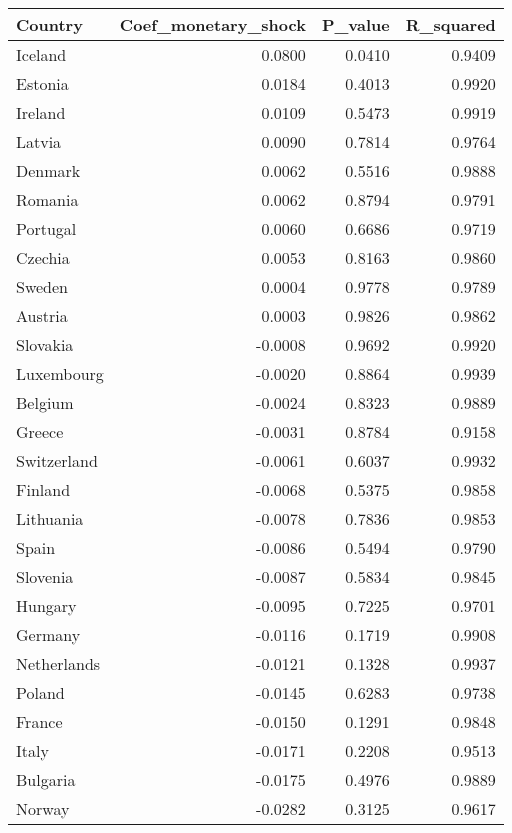 \begin{tabular}{lrrr}
\toprule
Country & Coef_monetary_shock & P_value & R_squared \\
\midrule
Iceland & 0.0800 & 0.0410 & 0.9409 \\
Estonia & 0.0184 & 0.4013 & 0.9920 \\
Ireland & 0.0109 & 0.5473 & 0.9919 \\
Latvia & 0.0090 & 0.7814 & 0.9764 \\
Denmark & 0.0062 & 0.5516 & 0.9888 \\
Romania & 0.0062 & 0.8794 & 0.9791 \\
Portugal & 0.0060 & 0.6686 & 0.9719 \\
Czechia & 0.0053 & 0.8163 & 0.9860 \\
Sweden & 0.0004 & 0.9778 & 0.9789 \\
Austria & 0.0003 & 0.9826 & 0.9862 \\
Slovakia & -0.0008 & 0.9692 & 0.9920 \\
Luxembourg & -0.0020 & 0.8864 & 0.9939 \\
Belgium & -0.0024 & 0.8323 & 0.9889 \\
Greece & -0.0031 & 0.8784 & 0.9158 \\
Switzerland & -0.0061 & 0.6037 & 0.9932 \\
Finland & -0.0068 & 0.5375 & 0.9858 \\
Lithuania & -0.0078 & 0.7836 & 0.9853 \\
Spain & -0.0086 & 0.5494 & 0.9790 \\
Slovenia & -0.0087 & 0.5834 & 0.9845 \\
Hungary & -0.0095 & 0.7225 & 0.9701 \\
Germany & -0.0116 & 0.1719 & 0.9908 \\
Netherlands & -0.0121 & 0.1328 & 0.9937 \\
Poland & -0.0145 & 0.6283 & 0.9738 \\
France & -0.0150 & 0.1291 & 0.9848 \\
Italy & -0.0171 & 0.2208 & 0.9513 \\
Bulgaria & -0.0175 & 0.4976 & 0.9889 \\
Norway & -0.0282 & 0.3125 & 0.9617 \\
\bottomrule
\end{tabular}
